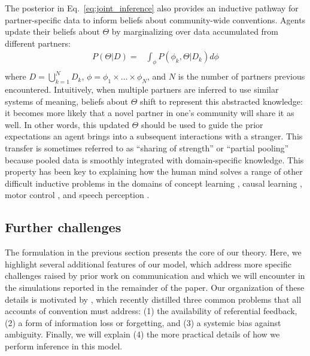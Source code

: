 The posterior in Eq.~\ref{eq:joint_inference} also provides an inductive pathway for partner-specific data to inform beliefs about community-wide conventions.
Agents update their beliefs about $\Theta$ by marginalizing over data accumulated from different partners:
\begin{equation}
\begin{split}
    P(\Theta | D)  = & \int_{\phi} P(\phi_k, \Theta | D_k) d\phi \\
\end{split}
\end{equation}
where $D = \bigcup_{k=1}^N D_k$, $\phi = \phi_1 \times \dots \times \phi_N$, and $N$ is the number of partners previous encountered. 
Intuitively, when multiple partners are inferred to use similar systems of meaning, beliefs about $\Theta$ shift to represent this abstracted knowledge: it becomes more likely that a novel partner in one's community will share it as well.
In other words, this updated $\Theta$ should be used to guide the prior expectations an agent brings into a subsequent interactions with a stranger.
This transfer is sometimes referred to as ``sharing of strength'' or ``partial pooling'' because pooled data is smoothly integrated with domain-specific knowledge.
This property has been key to explaining how the human mind solves a range of other difficult inductive problems in the domains of concept learning \cite{KempPerforsTenenbaum07_HBM, tenenbaum_how_2011}, causal learning \cite{KempGoodmanTenenbaum10_LearningToLearn,GoodmanUllmanTenenbaum11_TheoryOfCausality},  motor control \cite{berniker2008estimating}, and speech perception \cite{kleinschmidt2015robust}.

\subsection{Further challenges}

The formulation in the previous section presents the core of our theory.
Here, we highlight several additional features of our model, which address more specific challenges raised by prior work on communication and which we will encounter in the simulations reported in the remainder of the paper. 
Our organization of these details is motivated by , which recently distilled three common problems that all accounts of convention must address: (1) the availability of referential feedback, (2) a form of information loss or forgetting, and (3) a systemic bias against ambiguity.
Finally, we will explain (4) the more practical details of how we perform inference in this model. 

